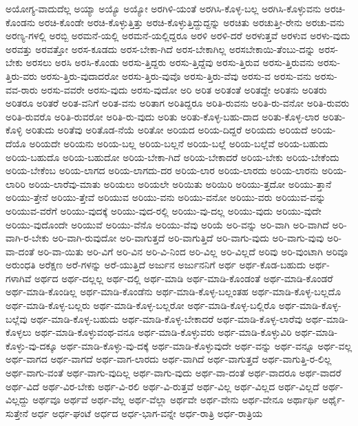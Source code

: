 {ಅಯೋಗ್ಯ-ವಾದುದೆಲ್ಲ
ಅಯ್ಯಾ
ಅಯ್ಯೊ
ಅಯ್ಯೋ
ಅರಗಿಳಿ-ಯಂತೆ
ಅರಗಿಸಿ-ಕೊಳ್ಳ-ಬಲ್ಲ
ಅರಗಿಸಿ-ಕೊಳ್ಳುವನು
ಅರಚಿ-ಕೊಂಡನು
ಅರಚಿ-ಕೊಂಡೇ
ಅರಚಿ-ಕೊಳ್ಳುತ್ತಿತ್ತು
ಅರಚಿ-ಕೊಳ್ಳುತ್ತಿದ್ದುದ್ದನ್ನು
ಅರಚಿತು
ಅರಚುತ್ತೀ-ರೇನು
ಅರಚು-ವನು
ಅರಣ್ಯ-ಗಳಲ್ಲಿ
ಅರಬ್ಬಿ
ಅರಮನೆ-ಯಲ್ಲಿ
ಅರಮನೆ-ಯಲ್ಲಿದ್ದರೂ
ಅರಳಿ
ಅರಳಿ-ದರೆ
ಅರಳುತ್ತವೆ
ಅರಳುವ
ಅರಳು-ವುದು
ಅರವತ್ತು
ಅರವತ್ತೋ
ಅರಸ-ಕೂಡದು
ಅರಸ-ಬೇಕಾ-ಗಿದೆ
ಅರಸ-ಬೇಕಾಗಿಲ್ಲ
ಅರಸಬೇಕಾಯಿ-ತೆಂಬು-ದನ್ನು
ಅರಸ-ಬೇಕು
ಅರಸಲು
ಅರಸಿ
ಅರಸಿ-ಕೊಂಡು
ಅರಸು-ತ್ತಿದ್ದರು
ಅರಸು-ತ್ತಿದ್ದೆವು
ಅರಸು-ತ್ತಿರುವ
ಅರಸು-ತ್ತಿರುವನು
ಅರಸು-ತ್ತಿರು-ವರು
ಅರಸು-ತ್ತಿರು-ವುದಾದರೋ
ಅರಸು-ತ್ತಿರು-ವುವೊ
ಅರಸು-ತ್ತಿರು-ವೆವು
ಅರಸು-ವ
ಅರಸು-ವನು
ಅರಸು-ವವ-ರಾರು
ಅರಸು-ವವರೇ
ಅರಸು-ವುದು
ಅರಸು-ವುದೋ
ಅರಿ
ಅರಿತ
ಅರಿತಂತೆ
ಅರಿತದ್ದೇ
ಅರಿತನು
ಅರಿತರು
ಅರಿತರೂ
ಅರಿತರೆ
ಅರಿತ-ವನಿಗೆ
ಅರಿತ-ವನು
ಅರಿತಾಗ
ಅರಿತಿದ್ದರೂ
ಅರಿತಿ-ರುವನು
ಅರಿತಿ-ರು-ವನೋ
ಅರಿತಿ-ರುವರು
ಅರಿತಿ-ರುವರೊ
ಅರಿತಿ-ರುವರೋ
ಅರಿತಿ-ರು-ವುದು
ಅರಿತು
ಅರಿತು-ಕೊಳ್ಳ-ಬಹು-ದಾದ
ಅರಿತು-ಕೊಳ್ಳ-ಲಾರ
ಅರಿತು-ಕೊಳ್ಳಿ
ಅರಿತುದು
ಅರಿತೆವು
ಅರಿತೊಡ-ನೆಯೆ
ಅರಿತೋ
ಅರಿಯದ
ಅರಿಯ-ದಿದ್ದರೆ
ಅರಿಯದು
ಅರಿಯದೆ
ಅರಿಯ-ದೆಯೊ
ಅರಿಯದೇ
ಅರಿಯನು
ಅರಿಯ-ಬಲ್ಲ
ಅರಿಯ-ಬಲ್ಲನೆ
ಅರಿಯ-ಬಲ್ಲೆ
ಅರಿಯ-ಬಲ್ಲೆವೆ
ಅರಿಯ-ಬಹುದು
ಅರಿಯ-ಬಹುದೊ
ಅರಿಯ-ಬಹುದೋ
ಅರಿಯ-ಬೇಕಾ-ಗಿದೆ
ಅರಿಯ-ಬೇಕಾದರೆ
ಅರಿಯ-ಬೇಕು
ಅರಿಯ-ಬೇಕೆಂದು
ಅರಿಯ-ಬೇಕೆಂಬ
ಅರಿಯ-ಲಾಗದ
ಅರಿಯ-ಲಾಗದು-ದರ
ಅರಿಯ-ಲಾರ
ಅರಿಯ-ಲಾರದು
ಅರಿಯ-ಲಾರನು
ಅರಿಯ-ಲಾರಿರಿ
ಅರಿಯ-ಲಾರೆವು-ಮಾತು
ಅರಿಯಲು
ಅರಿಯಲೇ
ಅರಿಯಿತು
ಅರಿಯಿರಿ
ಅರಿಯು-ತ್ತದೋ
ಅರಿಯು-ತ್ತಾನೆ
ಅರಿಯು-ತ್ತೇನೆ
ಅರಿಯು-ತ್ತೇವೆ
ಅರಿಯುವ
ಅರಿಯು-ವನು
ಅರಿಯು-ವನೋ
ಅರಿಯು-ವರು
ಅರಿಯುವ-ವನ್ನು
ಅರಿಯುವ-ವರೆಗೆ
ಅರಿಯು-ವುದಕ್ಕೆ
ಅರಿಯು-ವುದ-ರಲ್ಲಿ
ಅರಿಯು-ವು-ದಲ್ಲ
ಅರಿಯು-ವುದು
ಅರಿಯು-ವುದೇ
ಅರಿಯು-ವುದೊಂದೇ
ಅರಿಯುವೆ
ಅರಿಯು-ವೆನೊ
ಅರಿಯು-ವೆವು
ಅರಿಯೆ
ಅರಿ-ವನ್ನು
ಅರಿ-ವಾಗಿ
ಅರಿ-ವಾಗಿದೆ
ಅರಿ-ವಾಗಿ-ರ-ಬೇಕು
ಅರಿ-ವಾಗಿ-ರುವುದೋ
ಅರಿ-ವಾಗುತ್ತದೆ
ಅರಿ-ವಾಗುತ್ತಿದೆ
ಅರಿ-ವಾಗು-ವುದು
ಅರಿ-ವಾಗು-ವುವು
ಅರಿ-ವಾ-ದಂತೆ
ಅರಿ-ವಾ-ಯಿತು
ಅರಿ-ವಿಗೆ
ಅರಿ-ವಿನ
ಅರಿ-ವಿ-ನಿಂದ
ಅರಿ-ವಿಲ್ಲ
ಅರಿ-ವಿಲ್ಲದೆ
ಅರಿವು
ಅರಿ-ವುಂಟಾಗಿ
ಅರಿವೂ
ಅರುಂಧತಿ
ಅರೆಕ್ಷಣ
ಅರೆ-ಗಳನ್ನು
ಅರೆ-ಯುತ್ತಿದೆ
ಅರ್ಜುನ
ಅರ್ಜುನನಿಗೆ
ಅರ್ಥ
ಅರ್ಥ-ಕೊಡ-ಬಹುದು
ಅರ್ಥ-ಗಳಾಗಿವೆ
ಅರ್ಥದ
ಅರ್ಥ-ದಲ್ಲಲ್ಲ
ಅರ್ಥ-ದಲ್ಲಿ
ಅರ್ಥ-ಮಾಡಿ
ಅರ್ಥ-ಮಾಡಿ-ಕೊಂಡಂತೆ
ಅರ್ಥ-ಮಾಡಿ-ಕೊಂಡರೆ
ಅರ್ಥ-ಮಾಡಿ-ಕೊಂಡಿಲ್ಲ
ಅರ್ಥ-ಮಾಡಿ-ಕೊಂಡೆನು
ಅರ್ಥ-ಮಾಡಿ-ಕೊಳ್ಳ-ಬಲ್ಲಂತಹ
ಅರ್ಥ-ಮಾಡಿ-ಕೊಳ್ಳ-ಬಲ್ಲದೊ
ಅರ್ಥ-ಮಾಡಿ-ಕೊಳ್ಳ-ಬಲ್ಲರು
ಅರ್ಥ-ಮಾಡಿ-ಕೊಳ್ಳ-ಬಲ್ಲರೋ
ಅರ್ಥ-ಮಾಡಿ-ಕೊಳ್ಳ-ಬಲ್ಲಿರೊ
ಅರ್ಥ-ಮಾಡಿ-ಕೊಳ್ಳ-ಬಲ್ಲೆವು
ಅರ್ಥ-ಮಾಡಿ-ಕೊಳ್ಳ-ಬಹುದು
ಅರ್ಥ-ಮಾಡಿ-ಕೊಳ್ಳ-ಬೇಕಾದರೆ
ಅರ್ಥ-ಮಾಡಿ-ಕೊಳ್ಳ-ಲಾರೆವು
ಅರ್ಥ-ಮಾಡಿ-ಕೊಳ್ಳಲು
ಅರ್ಥ-ಮಾಡಿ-ಕೊಳ್ಳುವಂಥ-ವನೂ
ಅರ್ಥ-ಮಾಡಿ-ಕೊಳ್ಳುವರು
ಅರ್ಥ-ಮಾಡಿ-ಕೊಳ್ಳುವಿರಿ
ಅರ್ಥ-ಮಾಡಿ-ಕೊಳ್ಳು-ವು-ದಕ್ಕೂ
ಅರ್ಥ-ಮಾಡಿ-ಕೊಳ್ಳು-ವು-ದಕ್ಕೆ
ಅರ್ಥ-ಮಾಡಿ-ಕೊಳ್ಳುವುದೇ
ಅರ್ಥ-ವನ್ನು
ಅರ್ಥ-ವನ್ನೂ
ಅರ್ಥ-ವಲ್ಲ
ಅರ್ಥ-ವಾಗದ
ಅರ್ಥ-ವಾಗದೆ
ಅರ್ಥ-ವಾಗ-ಲಾರದು
ಅರ್ಥ-ವಾಗಿದೆ
ಅರ್ಥ-ವಾಗುತ್ತದೆ
ಅರ್ಥ-ವಾಗುತ್ತಿ-ರ-ಲಿಲ್ಲ
ಅರ್ಥ-ವಾಗು-ವಂತೆ
ಅರ್ಥ-ವಾಗು-ವುದಿಲ್ಲ
ಅರ್ಥ-ವಾಗು-ವುದು
ಅರ್ಥ-ವಾ-ದಂತೆ
ಅರ್ಥ-ವಾದರೂ
ಅರ್ಥ-ವಾದರೆ
ಅರ್ಥ-ವಿದೆ
ಅರ್ಥ-ವಿರ-ಬೇಕು
ಅರ್ಥ-ವಿ-ರಲಿ
ಅರ್ಥ-ವಿ-ರುತ್ತವೆ
ಅರ್ಥ-ವಿಲ್ಲ
ಅರ್ಥ-ವಿಲ್ಲದ
ಅರ್ಥ-ವಿಲ್ಲದೆ
ಅರ್ಥ-ವಿಲ್ಲದ್ದು
ಅರ್ಥವೂ
ಅರ್ಥವೆ
ಅರ್ಥ-ವೆಲ್ಲ
ಅರ್ಥ-ವೆಲ್ಲಾ
ಅರ್ಥವೇ
ಅರ್ಥ-ವೇನು
ಅರ್ಥ-ವೇನೂ
ಅರ್ಥಾರ್ಥಿ
ಅರ್ಥೈ-ಸುತ್ತೇನೆ
ಅರ್ಧ
ಅರ್ಧ-ಘಂಟೆ
ಅರ್ಧದ
ಅರ್ಧ-ಭಾಗ-ವನ್ನೇ
ಅರ್ಧ-ರಾತ್ರಿ
ಅರ್ಧ-ರಾತ್ರಿಯ
}
